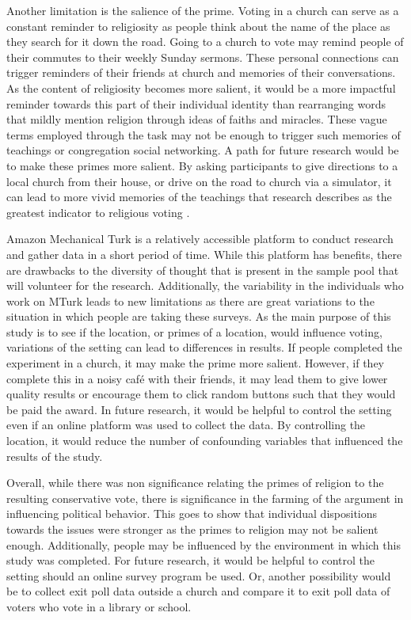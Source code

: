\documentclass[letterpaper,man,natbib,noextraspace,12pt]{apa6}  %
\begin{document}
Another limitation is the salience of the prime. Voting in a church can serve as a constant reminder to religiosity as people think about the name of the place as they search for it down the road. Going to a church to vote may remind people of their commutes to their weekly Sunday sermons. These personal connections can trigger reminders of their friends at church and memories of their conversations. As the content of religiosity becomes more salient, it would be a more impactful reminder towards this part of their individual identity than rearranging words that mildly mention religion through ideas of faiths and miracles. These vague terms employed through the task may not be enough to trigger such memories of teachings or congregation social networking. A path for future research would be to make these primes more salient. By asking participants to give directions to a local church from their house, or drive on the road to church via a simulator, it can lead to more vivid memories of the teachings that research describes as the greatest indicator to religious voting \citep{putnam_american_2010}.

Amazon Mechanical Turk is a relatively accessible platform to conduct research and gather data in a short period of time. While this platform has benefits, there are drawbacks to the diversity of thought that is present in the sample pool that will volunteer for the research. Additionally, the variability in the individuals who work on MTurk leads to new limitations as there are great variations to the situation in which people are taking these surveys. As the main purpose of this study is to see if the location, or primes of a location, would influence voting, variations of the setting can lead to differences in results. If people completed the experiment in a church, it may make the prime more salient. However, if they complete this in a noisy café with their friends, it may lead them to give lower quality results or encourage them to click random buttons such that they would be paid the award. In future research, it would be helpful to control the setting even if an online platform was used to collect the data. By controlling the location, it would reduce the number of confounding variables that influenced the results of the study. 

Overall, while there was non significance relating the primes of religion to the resulting conservative vote, there is significance in the farming of the argument in influencing political behavior. This goes to show that individual dispositions towards the issues were stronger as the primes to religion may not be salient enough. Additionally, people may be influenced by the environment in which this study was completed. For future research, it would be helpful to control the setting should an online survey program be used. Or, another possibility would be to collect exit poll data outside a church and compare it to exit poll data of voters who vote in a library or school. 
\end{document}
